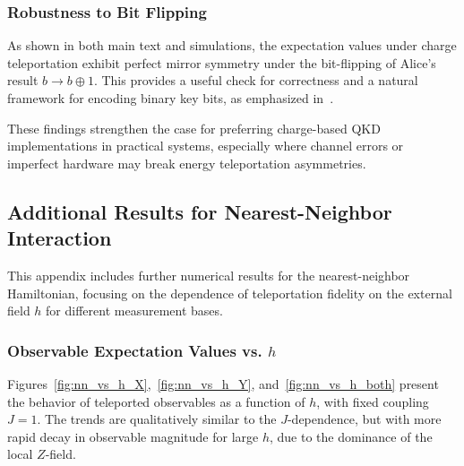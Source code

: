 \subsubsection{Robustness to Bit Flipping}

As shown in both main text and simulations, the expectation values under charge teleportation exhibit perfect mirror symmetry under the bit-flipping of Alice’s result \( b \to b \oplus 1 \). This provides a useful check for correctness and a natural framework for encoding binary key bits, as emphasized in~\cite{QKDbyQET}.

These findings strengthen the case for preferring charge-based QKD implementations in practical systems, especially where channel errors or imperfect hardware may break energy teleportation asymmetries.

\subsection{Additional Results for Nearest-Neighbor Interaction}
\label{appendix:nn_detailed}

This appendix includes further numerical results for the nearest-neighbor Hamiltonian, focusing on the dependence of teleportation fidelity on the external field \( h \) for different measurement bases.

\subsubsection{Observable Expectation Values vs. \texorpdfstring{\( h \)}{h}}

Figures~\ref{fig:nn_vs_h_X},~\ref{fig:nn_vs_h_Y}, and~\ref{fig:nn_vs_h_both} present the behavior of teleported observables as a function of \( h \), with fixed coupling \( J=1 \). The trends are qualitatively similar to the \( J \)-dependence, but with more rapid decay in observable magnitude for large \( h \), due to the dominance of the local \( Z \)-field.


